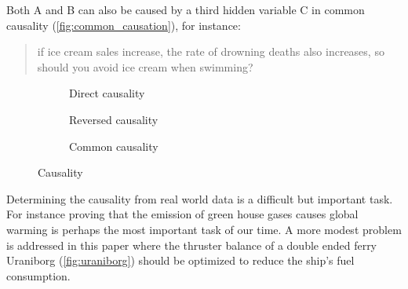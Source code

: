\documentclass[fleqn,10pt]{olplainarticle}
\begin{document}
\noindent Both A and B can also be caused by a third hidden variable C in common causality (\autoref{fig:common_causation}), for instance:
\begin{quote}
if ice cream sales increase, the rate of drowning deaths also increases, so should you avoid ice cream when swimming? 
\end{quote}
\begin{figure}[!htb]
    \begin{subfigure}[b]{0.3\textwidth}
        \centering
        \caption{Direct causality}
        \label{fig:direct_causation}
    \end{subfigure}
    \hfill
    \begin{subfigure}[b]{0.3\textwidth}
        \centering
        \caption{Reversed causality}
        \label{fig:reversed_causation}
    \end{subfigure}
    \hfill
    \begin{subfigure}[b]{0.3\textwidth}
        \centering
        \caption{Common causality}
        \label{fig:common_causation}
    \end{subfigure}
    \caption{Causality}
    \label{fig:causal_relationships}
    
\end{figure}
Determining the causality from real world data is a difficult but important task. For instance proving that the emission of green house gases causes global warming is perhaps the most important task of our time. A more modest problem is addressed in this paper where the thruster balance of a double ended ferry Uraniborg (\autoref{fig:uraniborg}) should be optimized to reduce the ship's fuel consumption. 
\end{document}

